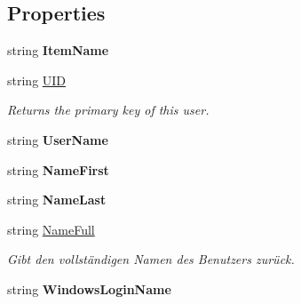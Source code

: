 \subsection*{Properties}
\begin{DoxyCompactItemize}
\item 
string {\bfseries Item\+Name}\hypertarget{class_products_1_1_model_1_1_entities_1_1_user_add5544f824b1adae08d0428890c04dd0}{}\label{class_products_1_1_model_1_1_entities_1_1_user_add5544f824b1adae08d0428890c04dd0}

\item 
string \hyperlink{class_products_1_1_model_1_1_entities_1_1_user_abf237dca4fdc1facc2aac17b8d078a66}{U\+ID}
\begin{DoxyCompactList}\small\item\em Returns the primary key of this user. \end{DoxyCompactList}\item 
string {\bfseries User\+Name}\hypertarget{class_products_1_1_model_1_1_entities_1_1_user_a75849ecd0d7efdc0496beea3313d9e7c}{}\label{class_products_1_1_model_1_1_entities_1_1_user_a75849ecd0d7efdc0496beea3313d9e7c}

\item 
string {\bfseries Name\+First}\hypertarget{class_products_1_1_model_1_1_entities_1_1_user_a568a866ae645126f925c23eb860e8746}{}\label{class_products_1_1_model_1_1_entities_1_1_user_a568a866ae645126f925c23eb860e8746}

\item 
string {\bfseries Name\+Last}\hypertarget{class_products_1_1_model_1_1_entities_1_1_user_a050d88f35095e89864fd58fbbd05a663}{}\label{class_products_1_1_model_1_1_entities_1_1_user_a050d88f35095e89864fd58fbbd05a663}

\item 
string \hyperlink{class_products_1_1_model_1_1_entities_1_1_user_aba724ae4c5bcc21396b6046d67bc5a9b}{Name\+Full}
\begin{DoxyCompactList}\small\item\em Gibt den vollständigen Namen des Benutzers zurück. \end{DoxyCompactList}\item 
string {\bfseries Windows\+Login\+Name}\hypertarget{class_products_1_1_model_1_1_entities_1_1_user_a5441bf68eb7082eab097adcab0dd36b5}{}\label{class_products_1_1_model_1_1_entities_1_1_user_a5441bf68eb7082eab097adcab0dd36b5}


\end{DoxyCompactItemize}
